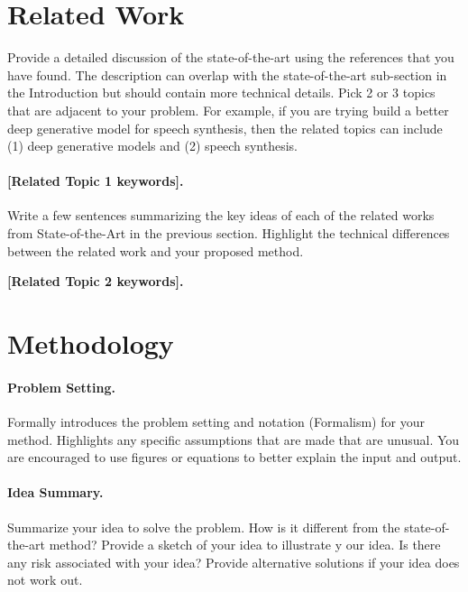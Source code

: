 \documentclass{article}
\begin{document}
\section{Related Work}
Provide a detailed discussion of the state-of-the-art using the references that you have found. The description can overlap with the state-of-the-art sub-section in the Introduction but should contain more technical details. Pick 2 or 3 topics that are adjacent to your problem. For example, if you are trying build a better deep generative model for speech synthesis, then the related topics can include (1) deep generative models and (2) speech synthesis.

\paragraph{[Related Topic 1 keywords].} Write a few sentences summarizing the key ideas of each of the related works from State-of-the-Art in the previous section. Highlight the technical differences between the related work and your proposed method.

\textbf{[Related Topic 2 keywords].} 





\section{Methodology}

\paragraph{Problem Setting.}
Formally introduces the problem setting and notation (Formalism) for your method. Highlights any specific assumptions that are made that are unusual. You are encouraged to use figures or equations to better explain the input and output.

\paragraph{Idea Summary.}
Summarize your idea to solve the problem.  How is it different from the state-of-the-art method? Provide a sketch of your idea to illustrate y our idea. Is there any risk associated with your idea? Provide alternative solutions if your idea does not work out.
\end{document}
